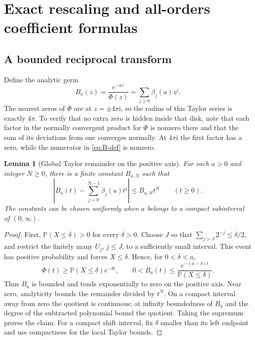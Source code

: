 \documentclass[11pt,a4paper]{article}
\numberwithin{equation}{section}
\newtheorem{lemma}[lemma]{Lemma}
\theoremstyle{definition}
\theoremstyle{remark}
\newcommand{\ii}{\mathrm i}
\newcommand{\abs}[1]{\left|#1\right|}
\begin{document}
\section{Exact rescaling and all-orders coefficient formulas}
\label{sec:scaling}

\subsection{A bounded reciprocal transform}
Define the analytic germ
\begin{equation}
 B_a(z)=\frac{e^{-az}}{\Phi(z)}=\sum_{j\ge0}\beta_j(a)z^j.
 \label{eq:B-def}
\end{equation}
The nearest zeros of $\Phi$ are at $z=\pm4\pi\ii$, so the radius
of this Taylor series is exactly $4\pi$. To verify that no extra zero
is hidden inside that disk, note that each factor in the normally
convergent product for $\Phi$ is nonzero there and that the sum of
its deviations from one converges normally. At $4\pi\ii$ the first
factor has a zero, while the numerator in \cref{eq:B-def} is
nonzero.

\begin{lemma}[Global Taylor remainder on the positive axis]
\label{lem:B-global}
For each $a>0$ and integer $N\ge0$, there is a finite constant
$B_{a,N}$ such that
\begin{equation}
 \abs{B_a(t)-\sum_{j=0}^{N-1}\beta_j(a)t^j}
 \le B_{a,N}t^N\qquad(t\ge0).
 \label{eq:B-global}
\end{equation}
The constants can be chosen uniformly when $a$ belongs to a compact
subinterval of $(0,\infty)$.
\end{lemma}
\begin{proof}
First, $\mathbb P(X\le\delta)>0$ for every $\delta>0$.
Choose $J$ so that $\sum_{j>J}2^{-j}\le\delta/2$, and restrict the
finitely many $U_j$, $j\le J$, to a sufficiently small interval.
This event has positive probability and forces $X\le\delta$.
Hence, for $0<\delta<a$,
\[
 \Phi(t)\ge\mathbb P(X\le\delta)e^{-\delta t},\qquad
 0<B_a(t)\le\frac{e^{-(a-\delta)t}}{\mathbb P(X\le\delta)}.
\]
Thus $B_a$ is bounded and tends exponentially to zero on the positive
axis. Near zero, analyticity bounds the remainder divided by $t^N$.
On a compact interval away from zero the quotient is continuous;
at infinity boundedness of $B_a$ and the degree of the subtracted
polynomial bound the quotient. Taking the supremum proves the claim.
For a compact shift interval, fix $\delta$ smaller than its left
endpoint and use compactness for the local Taylor bounds.
\end{proof}
\end{document}
